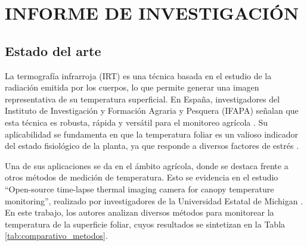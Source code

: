 \doublespacing
\chapter{INFORME DE INVESTIGACIÓN}

\section{Estado del arte}
\label{sec:estado_del_arte}

La termografía infrarroja (IRT) es una técnica basada en el estudio de la radiación emitida por los cuerpos, lo que permite generar una imagen representativa de su temperatura superficial. En España, investigadores del Instituto de Investigación y Formación Agraria y Pesquera (IFAPA) señalan que esta técnica es robusta, rápida y versátil para el monitoreo agrícola . Su aplicabilidad se fundamenta en que la temperatura foliar es un valioso indicador del estado fisiológico de la planta, ya que responde a diversos factores de estrés .

Una de sus aplicaciones se da en el ámbito agrícola, donde se destaca frente a otros métodos de medición de temperatura. Esto se evidencia en el estudio ``Open-source time-lapse thermal imaging camera for canopy temperature monitoring'', realizado por investigadores de la Universidad Estatal de Michigan . En este trabajo, los autores analizan diversos métodos para monitorear la temperatura de la superficie foliar, cuyos resultados se sintetizan en la Tabla \ref{tab:comparativo_metodos}.

